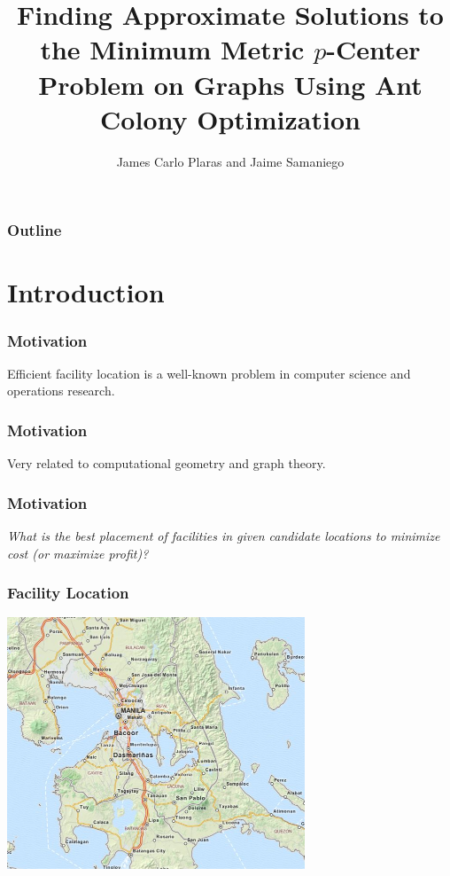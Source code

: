 \documentclass[12pt]{beamer}
\title{Finding Approximate Solutions to the Minimum Metric $p$-Center Problem on Graphs Using Ant Colony Optimization}
\author{James Carlo Plaras and Jaime Samaniego}
\date{}
\begin{document}
\maketitle

\begin{frame}
\frametitle{Outline}
\tableofcontents
\end{frame}


\section{Introduction}
\begin{frame}
\frametitle{Motivation}
\begin{center}
Efficient \alert{facility location} is a well-known problem in computer science and operations research.
\end{center}
\end{frame}

\begin{frame}
\frametitle{Motivation}
\begin{center}
Very related to computational geometry and graph theory.
\end{center}
\end{frame}

\begin{frame}
\frametitle{Motivation}
\begin{center}
\textit{What is the \alert{best} placement of facilities in given candidate locations to minimize cost (or maximize profit)?}
\end{center}
\end{frame}

\begin{frame}
\frametitle{Facility Location}
\begin{center}
\includegraphics[height=75mm]{Images/Intro1}\\
\end{center}
\end{frame}
\end{document}
